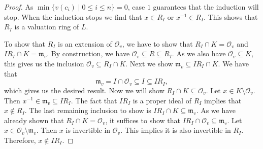 \documentclass[10pt,a4paper]{amsart}
\begin{document}
\begin{proof}
As $\min\{v(c_i)\mid0\leq i\leq n\}=0$, case $1$ guarantees that the induction will stop.
When the induction stops we find that $x\in R_I$ or $x^{-1}\in R_I$.
This shows that $R_I$ is a valuation ring of $L$.

To show that $R_I$ is an extension of $\mathcal{O}_v$, we have to show that $R_I\cap K=\mathcal{O}_v$ and $IR_I\cap K=\mathfrak{m}_v$.
By construction, we have $\mathcal{O}_v\subseteq R\subseteq R_I$.
As we also have $\mathcal{O}_v\subseteq K$, this gives us the inclusion $\mathcal{O}_v\subseteq R_I\cap K$.
Next we show $\mathfrak{m}_v\subseteq IR_I\cap K$.
We have that
$$\mathfrak{m}_v=I\cap \mathcal{O}_v\subseteq I\subseteq IR_I,$$
which gives us the desired result.
Now we will show $R_I\cap K\subseteq \mathcal{O}_v$.
Let $x\in K\setminus \mathcal{O}_v$. Then $x^{-1}\in\mathfrak{m}_v\subseteq IR_I$.
The fact that $IR_I$ is a proper ideal of $R_I$ implies that $x\notin R_I$.
The last remaining inclusion to show is $IR_I\cap K\subseteq\mathfrak{m}_v$.
As we have already shown that $R_I\cap K=\mathcal{O}_v$, it suffices to show that $IR_I\cap \mathcal{O}_v\subseteq\mathfrak{m}_v$.
Let $x\in \mathcal{O}_v\setminus\mathfrak{m}_v$.
Then $x$ is invertible in $\mathcal{O}_v$.
This implies it is also invertible in $R_I$.
Therefore, $x\notin IR_I$.
\end{proof}
\end{document}
